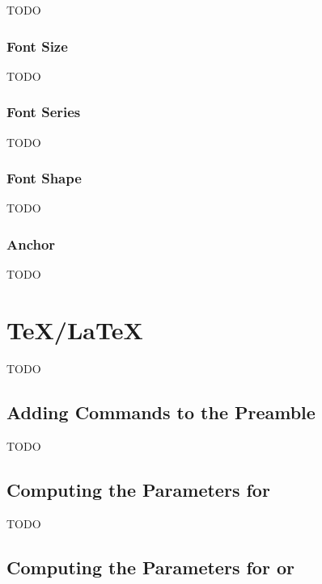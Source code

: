 TODO


\subsection{Font Size}\label{sec:fontsize}


TODO


\subsection{Font Series}\label{sec:fontseries}


TODO


\subsection{Font Shape}\label{sec:fontshape}


TODO


\subsection{Anchor}\label{sec:fontanchor}


TODO


\chapter{\TeX/\LaTeX}\label{sec:tex}

TODO


\section{Adding Commands to the Preamble}\label{sec:preamble}

TODO


\section{Computing the Parameters for }\label{sec:parshape}

TODO


\section{Computing the Parameters for  or
}
\label{sec:shapepar}

